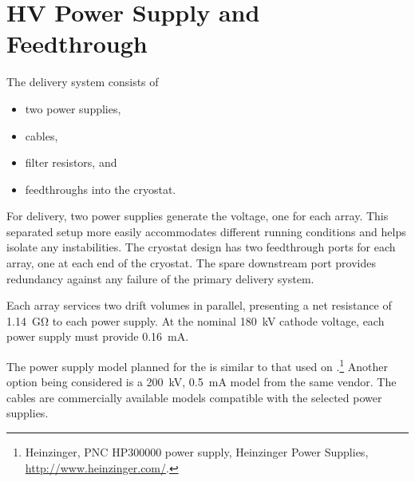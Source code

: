 
\section {HV Power Supply and Feedthrough}

The  delivery system consists of
\begin{itemize}
\item two power supplies,
\item {} cables,
\item filter resistors, and
\item {} feedthroughs into the cryostat.
\end{itemize}

For  delivery, two power supplies generate the voltage, one for each  array. 
This separated setup more easily accommodates different running conditions and helps isolate any instabilities. 
The cryostat design has two feedthrough ports for each  array, one at each end of the cryostat. The spare downstream port provides redundancy against any failure of the primary  delivery system. 

Each  array 
services two drift volumes in parallel, 
presenting a net resistance of \SI{1.14}{\giga\ohm} to each power supply. At the nominal \SI{180}{kV} cathode voltage, each power supply must provide \SI{0.16}{mA}.

The power supply model planned for the  is similar to that used on .\footnote{Heinzinger, PNC HP300000  power supply, Heinzinger\texttrademark{} Power Supplies, \url{http://www.heinzinger.com/}.}  %
Another %
option being considered is a \SI{200}{kV}, \SI{0.5}{mA} model from the same vendor. 
The  cables are commercially available models compatible with the selected power supplies. 


